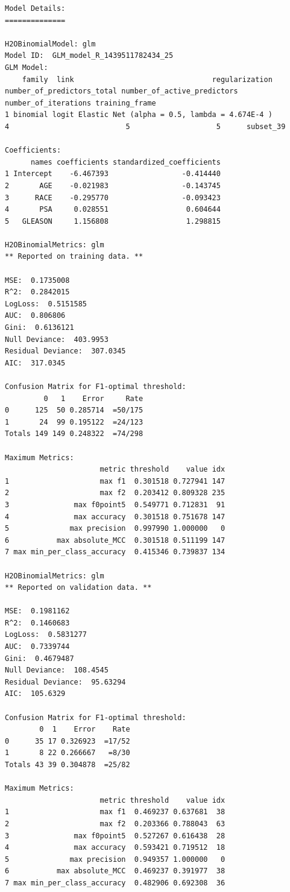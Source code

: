 \begin{lstlisting}[style=output]
Model Details:
==============

H2OBinomialModel: glm
Model ID:  GLM_model_R_1439511782434_25 
GLM Model:
    family  link                                regularization number_of_predictors_total number_of_active_predictors number_of_iterations training_frame
1 binomial logit Elastic Net (alpha = 0.5, lambda = 4.674E-4 )                          4                           5                    5      subset_39

Coefficients:
      names coefficients standardized_coefficients
1 Intercept    -6.467393                 -0.414440
2       AGE    -0.021983                 -0.143745
3      RACE    -0.295770                 -0.093423
4       PSA     0.028551                  0.604644
5   GLEASON     1.156808                  1.298815

H2OBinomialMetrics: glm
** Reported on training data. **

MSE:  0.1735008
R^2:  0.2842015
LogLoss:  0.5151585
AUC:  0.806806
Gini:  0.6136121
Null Deviance:  403.9953
Residual Deviance:  307.0345
AIC:  317.0345

Confusion Matrix for F1-optimal threshold:
         0   1    Error     Rate
0      125  50 0.285714  =50/175
1       24  99 0.195122  =24/123
Totals 149 149 0.248322  =74/298

Maximum Metrics:
                      metric threshold    value idx
1                     max f1  0.301518 0.727941 147
2                     max f2  0.203412 0.809328 235
3               max f0point5  0.549771 0.712831  91
4               max accuracy  0.301518 0.751678 147
5              max precision  0.997990 1.000000   0
6           max absolute_MCC  0.301518 0.511199 147
7 max min_per_class_accuracy  0.415346 0.739837 134

H2OBinomialMetrics: glm
** Reported on validation data. **

MSE:  0.1981162
R^2:  0.1460683
LogLoss:  0.5831277
AUC:  0.7339744
Gini:  0.4679487
Null Deviance:  108.4545
Residual Deviance:  95.63294
AIC:  105.6329

Confusion Matrix for F1-optimal threshold:
        0  1    Error    Rate
0      35 17 0.326923  =17/52
1       8 22 0.266667   =8/30
Totals 43 39 0.304878  =25/82

Maximum Metrics:
                      metric threshold    value idx
1                     max f1  0.469237 0.637681  38
2                     max f2  0.203366 0.788043  63
3               max f0point5  0.527267 0.616438  28
4               max accuracy  0.593421 0.719512  18
5              max precision  0.949357 1.000000   0
6           max absolute_MCC  0.469237 0.391977  38
7 max min_per_class_accuracy  0.482906 0.692308  36
\end{lstlisting}

